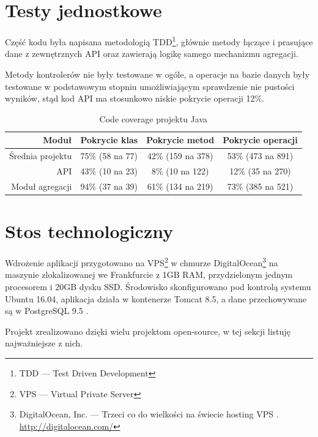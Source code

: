 \documentclass[openright]{xmgr}
\begin{document}
\section{Testy jednostkowe}

Część kodu była napisana metodologią TDD\footnote{TDD --- Test Driven Development},
głównie metody łączące i prasujące dane z zewnętrznych API oraz zawierają logikę samego mechanizmu agregacji.

Metody kontrolerów nie były testowane w ogóle,
a operacje na bazie danych były testowane w podstawowym stopniu umożliwiającym sprawdzenie nie pustości wyników,
stąd kod API ma stosunkowo niskie pokrycie operacji 12\%.

\begin{table}

	\begin{tabular}{|r|c|c|c|}
		\hline
		Moduł & Pokrycie klas & Pokrycie metod & Pokrycie operacji \\ \hline
		Średnia projektu & 75\% (58 na 77) & 42\% (159 na 378) & 53\% (473 na 891) \\
        \hline
		API & 43\% (10 na 23) & 8\% (10 na 122) & 12\% (35 na 270) \\
		Moduł agregacji & 94\% (37 na 39) & 61\% (134 na 219) & 73\% (385 na 521) \\
        \hline
	\end{tabular}

    \caption{
	Code coverage projektu Java
	}
\label{Projekt --- Code coverage}
\end{table}

\section{Stos technologiczny}

    Wdrożenie aplikacji przygotowano na VPS\footnote{VPS --- Virtual Private Server} w chmurze
    DigitalOcean\footnote{DigitalOcean, Inc. --- Trzeci co do wielkości na świecie hosting VPS \cite{digitalocean:growth}. \url{http://digitalocean.com/}}
    na maszynie zlokalizowanej we Frankfurcie z 1GB RAM, przydzielonym jednym procesorem i 20GB dysku SSD.
    Środowisko skonfigurowano pod kontrolą systemu Ubuntu 16.04,
    aplikacja działa w kontenerze Tomcat 8.5, a dane przechowywane są w PostgreSQL 9.5
    \cite{digitalocean:server-setup}\cite{digitalocean:tomcat-setup}\cite{digitalocean:postgres-setup}.

    Projekt zrealizowano dzięki wielu projektom open-source, w tej sekcji listuję najważniejsze z nich.
\end{document}
